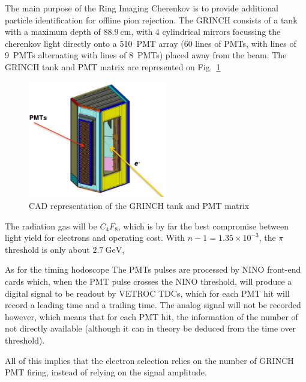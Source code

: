 The main purpose of the Ring Imaging Cherenkov is to provide additional particle identification for offline pion rejection.
The GRINCH consists of a tank with a maximum depth of $88.9~\mathrm{cm}$, with 4 cylindrical mirrors focussing the cherenkov light directly onto a 510~PMT array (60 lines of PMTs, with lines of 9~PMTs alternating with lines of 8~PMTs) placed away from the beam.
The GRINCH tank and PMT matrix are represented on Fig.~\ref{fig:grinch}
%
\begin{figure}[!h]
  \begin{center}
    \includegraphics[width=6cm]{Plots/GRINCH.png}
    \caption{CAD representation of the GRINCH tank and PMT matrix}
    \label{fig:grinch}
  \end{center}
\end{figure}
%
The radiation gas will be $C_4F_8$, which is by far the best compromise between light yield for electrons and operating cost.
With $n-1=1.35\times10^{-3}$, the $\pi$ threshold is only about $2.7~\mathrm{GeV}$,

As for the timing hodoscope The PMTs pulses are processed by NINO front-end cards which, when the PMT pulse crosses the NINO threshold, will produce a digital signal to be readout by VETROC TDCs, which for each PMT hit will record a leading time and a trailing time.
The analog signal will not be recorded however, which means that for each PMT hit, the information of the number of not directly available (although it can in theory be deduced from the time over threshold).

All of this implies that the electron selection relies on the number of GRINCH PMT firing, instead of relying on the signal amplitude.
%
%



